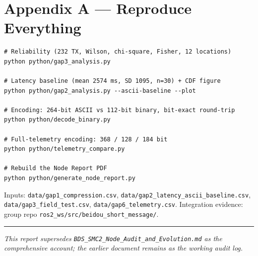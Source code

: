 \documentclass[11pt,a4paper]{article}
\begin{document}
\section*{Appendix A --- Reproduce Everything}

\begin{Verbatim}[fontsize=\small,frame=single,framesep=4pt]
# Reliability (232 TX, Wilson, chi-square, Fisher, 12 locations)
python python/gap3_analysis.py

# Latency baseline (mean 2574 ms, SD 1095, n=30) + CDF figure
python python/gap2_analysis.py --ascii-baseline --plot

# Encoding: 264-bit ASCII vs 112-bit binary, bit-exact round-trip
python python/decode_binary.py

# Full-telemetry encoding: 368 / 128 / 184 bit
python python/telemetry_compare.py

# Rebuild the Node Report PDF
python python/generate_node_report.py
\end{Verbatim}

Inputs: \texttt{data/gap1\_compression.csv}, \texttt{data/gap2\_latency\_ascii\_baseline.csv},
\texttt{data/gap3\_field\_test.csv}, \texttt{data/gap6\_telemetry.csv}. Integration evidence:
group repo \texttt{ros2\_ws/src/beidou\_short\_message/}.

\vspace{1em}
\hrule
\vspace{0.4em}
\textit{This report supersedes \texttt{BDS\_SMC2\_Node\_Audit\_and\_Evolution.md} as the
comprehensive account; the earlier document remains as the working audit log.}
\end{document}
